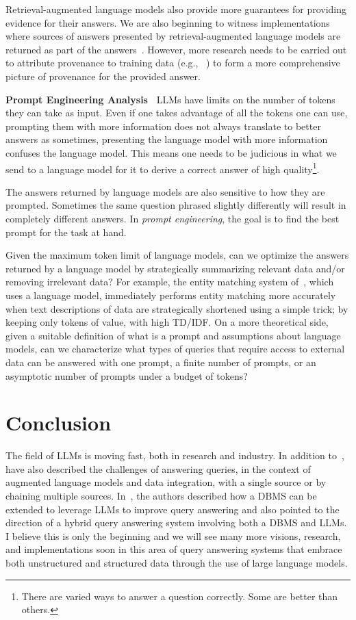 \documentclass[11pt,dvipdfm]{article}
\begin{document}
Retrieval-augmented language models also provide more guarantees for providing evidence for their answers. We are also beginning to witness implementations where sources of answers presented by retrieval-augmented language models are returned as part of the answers~\cite{retrievalqawithsources}. However, more research needs to be carried out to attribute provenance to training data (e.g., ~\cite{akyurek-etal-2022-towards, han-etal-2020-explaining, tracin2020}) to form a more comprehensive picture of provenance for the provided answer.


\smallskip
\noindent
{\bf Prompt Engineering Analysis~}
LLMs have limits on the number of tokens they can take as input. Even if one takes advantage of all the tokens one can use, prompting them with more information does not always translate to better answers as sometimes, presenting the language model with more information confuses the language model. This means one needs to be judicious in what we send to a language model for it to derive a correct answer of high quality\footnote{There are varied ways to answer a question correctly. Some are better than others.}. 

The answers returned by language models are also sensitive to how they are prompted. Sometimes the same question phrased slightly differently will result in completely different answers. In {\em prompt engineering}, the goal is to find the best prompt for the task at hand. 

Given the maximum token limit of language models, can we optimize the answers returned by a language model by strategically summarizing relevant data and/or removing irrelevant data? 
For example, the entity matching system of~\cite{Ditto}, which uses a language model, immediately performs entity matching more accurately when text descriptions of data are strategically shortened using a simple trick; by keeping only tokens of value, with high TD/IDF.
On a more theoretical side, given a suitable definition of what is a prompt and assumptions about language models, can we characterize what types of queries that require access to external data can be answered with one prompt, a finite number of prompts, or an asymptotic number of prompts under a budget of tokens?


\section{Conclusion}
The field of LLMs is moving fast, both in research and industry. In addition to~\cite{posttext}, \cite{halevy-yu} have also described the challenges of answering queries, in the context of augmented language models and data integration, with a single source or by chaining multiple sources. In~\cite{saeed2023querying}, the authors described how a DBMS can be extended to leverage LLMs to improve query answering and also pointed to the direction of a hybrid query answering system involving both a DBMS and LLMs. I believe this is only the beginning and we will see many more visions, research, and implementations soon in this area of query answering systems that embrace both unstructured and structured data through the use of large language models.
\end{document}
